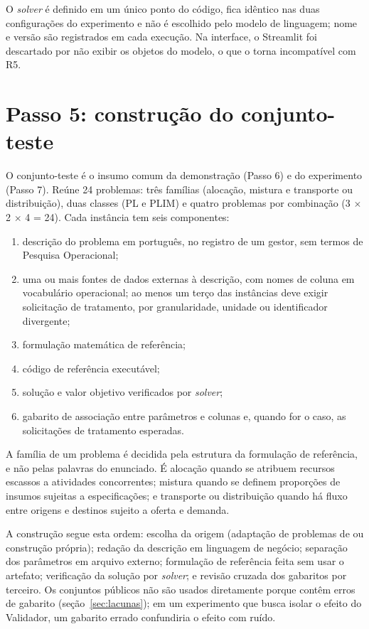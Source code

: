O \textit{solver} é definido em um único ponto do código, fica idêntico nas duas configurações do experimento e não é escolhido pelo modelo de linguagem; nome e versão são registrados em cada execução. Na interface, o Streamlit foi descartado por não exibir os objetos do modelo, o que o torna incompatível com R5.

\section{Passo 5: construção do conjunto-teste}
\label{sec:conjunto-teste}

O conjunto-teste é o insumo comum da demonstração (Passo 6) e do experimento (Passo 7). Reúne 24 problemas: três famílias (alocação, mistura e transporte ou distribuição), duas classes (PL e PLIM) e quatro problemas por combinação (3 $\times$ 2 $\times$ 4 = 24). Cada instância tem seis componentes:

\begin{enumerate}[label=\alph*)]
  \item descrição do problema em português, no registro de um gestor, sem termos de Pesquisa Operacional;
  \item uma ou mais fontes de dados externas à descrição, com nomes de coluna em vocabulário operacional; ao menos um terço das instâncias deve exigir solicitação de tratamento, por granularidade, unidade ou identificador divergente;
  \item formulação matemática de referência;
  \item código de referência executável;
  \item solução e valor objetivo verificados por \textit{solver};
  \item gabarito de associação entre parâmetros e colunas e, quando for o caso, as solicitações de tratamento esperadas.
\end{enumerate}

A família de um problema é decidida pela estrutura da formulação de referência, e não pelas palavras do enunciado. É alocação quando se atribuem recursos escassos a atividades concorrentes; mistura quando se definem proporções de insumos sujeitas a especificações; e transporte ou distribuição quando há fluxo entre origens e destinos sujeito a oferta e demanda.

A construção segue esta ordem: escolha da origem (adaptação de problemas de  ou construção própria); redação da descrição em linguagem de negócio; separação dos parâmetros em arquivo externo; formulação de referência feita sem usar o artefato; verificação da solução por \textit{solver}; e revisão cruzada dos gabaritos por terceiro. Os conjuntos públicos não são usados diretamente porque contêm erros de gabarito (seção~\ref{sec:lacunas}); em um experimento que busca isolar o efeito do Validador, um gabarito errado confundiria o efeito com ruído.

